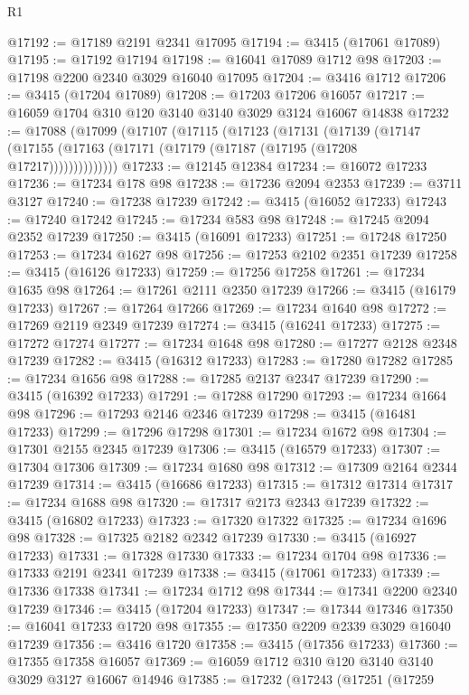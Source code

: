 \begin{lexlean}{R1}
\begin{coremodule}
@17192 := @17189 @2191 @2341 @17095
@17194 := @3415 (@17061 @17089)
@17195 := @17192 @17194
@17198 := @16041 @17089 @1712 @98
@17203 := @17198 @2200 @2340 @3029 @16040 @17095
@17204 := @3416 @1712
@17206 := @3415 (@17204 @17089)
@17208 := @17203 @17206 @16057
@17217 := @16059 @1704 @310 @120 @3140 @3140 @3029 @3124 @16067 @14838
@17232 := @17088
    (@17099
      (@17107
        (@17115
          (@17123
            (@17131
              (@17139
                (@17147 (@17155 (@17163 (@17171 (@17179 (@17187 (@17195 (@17208 @17217))))))))))))))
@17233 := @12145 @12384
@17234 := @16072 @17233
@17236 := @17234 @178 @98
@17238 := @17236 @2094 @2353
@17239 := @3711 @3127
@17240 := @17238 @17239
@17242 := @3415 (@16052 @17233)
@17243 := @17240 @17242
@17245 := @17234 @583 @98
@17248 := @17245 @2094 @2352 @17239
@17250 := @3415 (@16091 @17233)
@17251 := @17248 @17250
@17253 := @17234 @1627 @98
@17256 := @17253 @2102 @2351 @17239
@17258 := @3415 (@16126 @17233)
@17259 := @17256 @17258
@17261 := @17234 @1635 @98
@17264 := @17261 @2111 @2350 @17239
@17266 := @3415 (@16179 @17233)
@17267 := @17264 @17266
@17269 := @17234 @1640 @98
@17272 := @17269 @2119 @2349 @17239
@17274 := @3415 (@16241 @17233)
@17275 := @17272 @17274
@17277 := @17234 @1648 @98
@17280 := @17277 @2128 @2348 @17239
@17282 := @3415 (@16312 @17233)
@17283 := @17280 @17282
@17285 := @17234 @1656 @98
@17288 := @17285 @2137 @2347 @17239
@17290 := @3415 (@16392 @17233)
@17291 := @17288 @17290
@17293 := @17234 @1664 @98
@17296 := @17293 @2146 @2346 @17239
@17298 := @3415 (@16481 @17233)
@17299 := @17296 @17298
@17301 := @17234 @1672 @98
@17304 := @17301 @2155 @2345 @17239
@17306 := @3415 (@16579 @17233)
@17307 := @17304 @17306
@17309 := @17234 @1680 @98
@17312 := @17309 @2164 @2344 @17239
@17314 := @3415 (@16686 @17233)
@17315 := @17312 @17314
@17317 := @17234 @1688 @98
@17320 := @17317 @2173 @2343 @17239
@17322 := @3415 (@16802 @17233)
@17323 := @17320 @17322
@17325 := @17234 @1696 @98
@17328 := @17325 @2182 @2342 @17239
@17330 := @3415 (@16927 @17233)
@17331 := @17328 @17330
@17333 := @17234 @1704 @98
@17336 := @17333 @2191 @2341 @17239
@17338 := @3415 (@17061 @17233)
@17339 := @17336 @17338
@17341 := @17234 @1712 @98
@17344 := @17341 @2200 @2340 @17239
@17346 := @3415 (@17204 @17233)
@17347 := @17344 @17346
@17350 := @16041 @17233 @1720 @98
@17355 := @17350 @2209 @2339 @3029 @16040 @17239
@17356 := @3416 @1720
@17358 := @3415 (@17356 @17233)
@17360 := @17355 @17358 @16057
@17369 := @16059 @1712 @310 @120 @3140 @3140 @3029 @3127 @16067 @14946
@17385 := @17232
    (@17243
      (@17251
        (@17259

\end{coremodule}
\end{lexlean}
